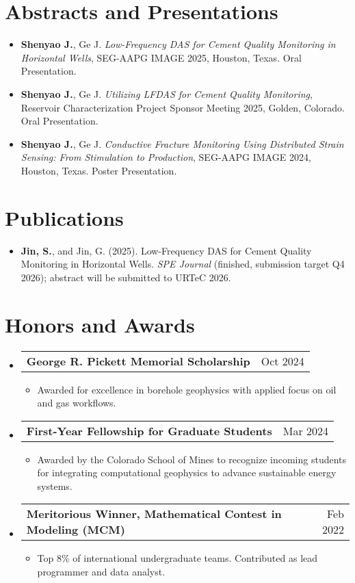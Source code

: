 \documentclass[letterpaper,13pt]{article}
\makeatletter
\newcommand{\resumeItem}[1]{\item\small{{#1 \vspace{-2pt}}}}
\newcommand{\resumeProjectHeading}[2]{
    \item
    \begin{tabular*}{0.97\textwidth}{l@{\extracolsep{\fill}}r}
      \small#1 & #2 \\
    \end{tabular*}\vspace{-7pt}
}
\newcommand{\resumeItemListStart}{\begin{itemize}[label={\small$\bullet$}]}
\newcommand{\resumeItemListEnd}{\end{itemize}\vspace{-5pt}}
\newcommand{\resumeSubHeadingListStart}{\begin{itemize}[leftmargin=0.15in, label={}]}
\newcommand{\resumeSubHeadingListEnd}{\end{itemize}}
\makeatother
\begin{document}
\section{Abstracts and Presentations}
\resumeSubHeadingListStart
  \resumeItem{\textbf{Shenyao J.}, Ge J. \textit{Low-Frequency DAS for Cement Quality Monitoring in Horizontal Wells}, SEG-AAPG IMAGE 2025, Houston, Texas. Oral Presentation.}
  \resumeItem{\textbf{Shenyao J.}, Ge J. \textit{Utilizing LFDAS for Cement Quality Monitoring}, Reservoir Characterization Project Sponsor Meeting 2025, Golden, Colorado. Oral Presentation.}
  \resumeItem{\textbf{Shenyao J.}, Ge J. \textit{Conductive Fracture Monitoring Using Distributed Strain Sensing: From Stimulation to Production}, SEG-AAPG IMAGE 2024, Houston, Texas. Poster Presentation.}
\resumeSubHeadingListEnd



\section{Publications}
\resumeSubHeadingListStart
  \resumeItem{\textbf{Jin, S.}, and Jin, G. (2025). Low-Frequency DAS for Cement Quality Monitoring in Horizontal Wells. \textit{SPE Journal} (finished, submission target Q4 2026); abstract will be submitted to URTeC 2026.}
\resumeSubHeadingListEnd


\section{Honors and Awards}
\resumeSubHeadingListStart

\resumeProjectHeading
  {\textbf{George R. Pickett Memorial Scholarship}}{Oct 2024}
\resumeItemListStart
  \resumeItem{Awarded for excellence in borehole geophysics with applied focus on oil and gas workflows.}
\resumeItemListEnd

\resumeProjectHeading
  {\textbf{First-Year Fellowship for Graduate Students}}{Mar 2024}
\resumeItemListStart
  \resumeItem{Awarded by the Colorado School of Mines to recognize incoming students for integrating computational geophysics to advance sustainable energy systems.}
\resumeItemListEnd

\resumeProjectHeading
  {\textbf{Meritorious Winner, Mathematical Contest in Modeling (MCM)}}{Feb 2022}
\resumeItemListStart
  \resumeItem{Top 8\% of international undergraduate teams. Contributed as lead programmer and data analyst.}
\resumeItemListEnd

\resumeSubHeadingListEnd
\end{document}
